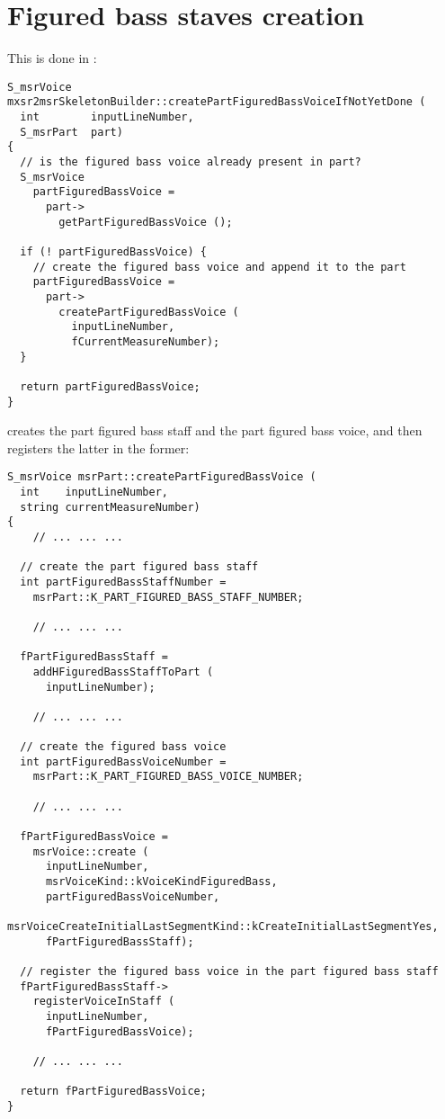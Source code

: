 \section{Figured bass staves creation}

This is done in :
\begin{lstlisting}[language=CPlusPlus]
S_msrVoice mxsr2msrSkeletonBuilder::createPartFiguredBassVoiceIfNotYetDone (
  int        inputLineNumber,
  S_msrPart  part)
{
  // is the figured bass voice already present in part?
  S_msrVoice
    partFiguredBassVoice =
      part->
        getPartFiguredBassVoice ();

  if (! partFiguredBassVoice) {
    // create the figured bass voice and append it to the part
    partFiguredBassVoice =
      part->
        createPartFiguredBassVoice (
          inputLineNumber,
          fCurrentMeasureNumber);
  }

  return partFiguredBassVoice;
}
\end{lstlisting}

 creates the part figured bass staff and the part figured bass voice, and then registers the latter in the former:
\begin{lstlisting}[language=CPlusPlus]
S_msrVoice msrPart::createPartFiguredBassVoice (
  int    inputLineNumber,
  string currentMeasureNumber)
{
	// ... ... ...

  // create the part figured bass staff
  int partFiguredBassStaffNumber =
    msrPart::K_PART_FIGURED_BASS_STAFF_NUMBER;

	// ... ... ...

  fPartFiguredBassStaff =
    addHFiguredBassStaffToPart (
      inputLineNumber);

	// ... ... ...

  // create the figured bass voice
  int partFiguredBassVoiceNumber =
    msrPart::K_PART_FIGURED_BASS_VOICE_NUMBER;

	// ... ... ...

  fPartFiguredBassVoice =
    msrVoice::create (
      inputLineNumber,
      msrVoiceKind::kVoiceKindFiguredBass,
      partFiguredBassVoiceNumber,
      msrVoiceCreateInitialLastSegmentKind::kCreateInitialLastSegmentYes,
      fPartFiguredBassStaff);

  // register the figured bass voice in the part figured bass staff
  fPartFiguredBassStaff->
    registerVoiceInStaff (
      inputLineNumber,
      fPartFiguredBassVoice);

	// ... ... ...

  return fPartFiguredBassVoice;
}
\end{lstlisting}



